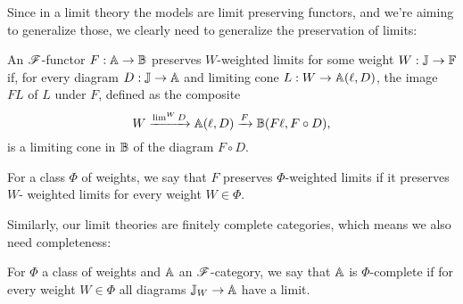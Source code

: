 \documentclass[../thesis.tex]{subfiles}
\begin{document}
%
%

Since in a limit theory the models are limit preserving functors, and we're aiming to generalize those, we clearly
need to generalize the preservation of limits:
\begin{definition}
  An ${\mathscr{F}}$-functor $F : {\mathbb{A}} \to {\mathbb{B}}$ preserves $W$-weighted limits for some weight $W : {\mathbb{J}} \to {\mathbb{F}}$ if,
  for every diagram $D : {\mathbb{J}} \to {\mathbb{A}}$ and limiting cone $L : W \to {\mathbb{A}}(\ell, D)$, the image $F L$ of $L$
  under $F$, defined as the composite
  \[W \xrightarrow{\lim^W D} {\mathbb{A}}(\ell, D) \xrightarrow{F} {\mathbb{B}}(F\ell, F \circ D),\]
  is a limiting cone in ${\mathbb{B}}$ of the diagram $F \circ D$.

  For a class $\Phi$ of weights, we say that $F$ preserves $\Phi$-weighted limits if it preserves $W$-%
  weighted limits for every weight $W \in \Phi$.
\end{definition}

Similarly, our limit theories are finitely complete categories, which means we also need completeness:
\begin{definition}[Completeness]
  For $\Phi$ a class of weights and ${\mathbb{A}}$ an ${\mathscr{F}}$-category, we say that ${\mathbb{A}}$ is $\Phi$-complete if for
  every weight $W \in \Phi$ all diagrams ${\mathbb{J}}_W \to {\mathbb{A}}$ have a limit.
\end{definition}
\end{document}
